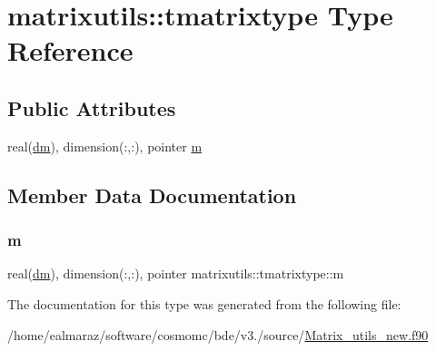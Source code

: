 \hypertarget{structmatrixutils_1_1tmatrixtype}{}\section{matrixutils\+:\+:tmatrixtype Type Reference}
\label{structmatrixutils_1_1tmatrixtype}
\subsection*{Public Attributes}
\begin{DoxyCompactItemize}
\item 
real(\mbox{\hyperlink{namespacematrixutils_a7bdc564986ea4d90f51201c75606ef3d}{dm}}), dimension(\+:,\+:), pointer \mbox{\hyperlink{structmatrixutils_1_1tmatrixtype_a44622716b44eebe5b687dab809f3a56b}{m}}
\end{DoxyCompactItemize}


\subsection{Member Data Documentation}
\mbox{\label{structmatrixutils_1_1tmatrixtype_a44622716b44eebe5b687dab809f3a56b}} 
\subsubsection{\texorpdfstring{m}{m}}
{\footnotesize\ttfamily real(\mbox{\hyperlink{namespacematrixutils_a7bdc564986ea4d90f51201c75606ef3d}{dm}}), dimension(\+:,\+:), pointer matrixutils\+::tmatrixtype\+::m}



The documentation for this type was generated from the following file\+:\begin{DoxyCompactItemize}
\item 
/home/ealmaraz/software/cosmomc/bde/v3./source/\mbox{\hyperlink{Matrix__utils__new_8f90}{Matrix\+\_\+utils\+\_\+new.\+f90}}\end{DoxyCompactItemize}
